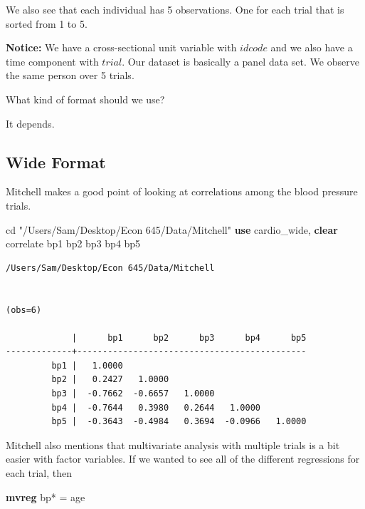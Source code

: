 \documentclass[
]{book}
\newenvironment{Shaded}{\begin{snugshade}}{\end{snugshade}}
\newcommand{\KeywordTok}[1]{\textcolor[rgb]{0.13,0.29,0.53}{\textbf{#1}}}
\newcommand{\NormalTok}[1]{#1}
\newcommand{\StringTok}[1]{\textcolor[rgb]{0.31,0.60,0.02}{#1}}
\begin{document}
We also see that each individual has 5 observations. One for each trial that is sorted from 1 to 5.

\textbf{Notice:}
We have a cross-sectional unit variable with \(idcode\) and we also have a time component with \(trial\). Our dataset is basically a panel data set. We observe the same person over 5 trials.

What kind of format should we use?

It depends.

\subsection*{Wide Format}\label{wide-format-1}

Mitchell makes a good point of looking at correlations among the blood pressure trials.

\begin{Shaded}
\begin{Highlighting}[]
\NormalTok{cd }\StringTok{"/Users/Sam/Desktop/Econ 645/Data/Mitchell"}
\KeywordTok{use}\NormalTok{ cardio\_wide, }\KeywordTok{clear}
\NormalTok{correlate bp1 bp2 bp3 bp4 bp5}
\end{Highlighting}
\end{Shaded}

\begin{verbatim}
/Users/Sam/Desktop/Econ 645/Data/Mitchell


(obs=6)

             |      bp1      bp2      bp3      bp4      bp5
-------------+---------------------------------------------
         bp1 |   1.0000
         bp2 |   0.2427   1.0000
         bp3 |  -0.7662  -0.6657   1.0000
         bp4 |  -0.7644   0.3980   0.2644   1.0000
         bp5 |  -0.3643  -0.4984   0.3694  -0.0966   1.0000
\end{verbatim}

Mitchell also mentions that multivariate analysis with multiple trials is a bit easier with factor variables. If we wanted to see all of the different regressions for each trial, then

\begin{Shaded}
\begin{Highlighting}[]
\KeywordTok{mvreg}\NormalTok{ bp* = age}
\end{Highlighting}
\end{Shaded}
\end{document}
